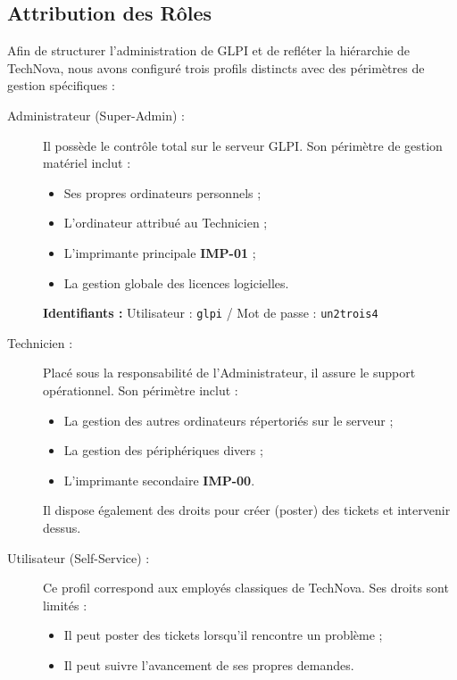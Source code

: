 \documentclass[a4paper,11pt]{article}
\begin{document}
\subsection{Attribution des Rôles}
Afin de structurer l'administration de GLPI et de refléter la hiérarchie de TechNova, nous avons configuré trois profils distincts avec des périmètres de gestion spécifiques :
\clearpage
\begin{description}
    \item[Administrateur (Super-Admin) :] 
    Il possède le contrôle total sur le serveur GLPI. Son périmètre de gestion matériel inclut :
    \begin{itemize}
        \item Ses propres ordinateurs personnels ;
        \item L'ordinateur attribué au Technicien ;
        \item L'imprimante principale \textbf{IMP-01} ;
        \item La gestion globale des licences logicielles.
    \end{itemize}
    \textbf{Identifiants :} Utilisateur : \texttt{glpi} / Mot de passe : \texttt{un2trois4}

    \item[Technicien :] 
    Placé sous la responsabilité de l'Administrateur, il assure le support opérationnel. Son périmètre inclut :
    \begin{itemize}
        \item La gestion des autres ordinateurs répertoriés sur le serveur ;
        \item La gestion des périphériques divers ;
        \item L'imprimante secondaire \textbf{IMP-00}.
    \end{itemize}
    Il dispose également des droits pour créer (poster) des tickets et intervenir dessus.

    \item[Utilisateur (Self-Service) :] 
    Ce profil correspond aux employés classiques de TechNova. Ses droits sont limités :
    \begin{itemize}
        \item Il peut poster des tickets lorsqu'il rencontre un problème ;
        \item Il peut suivre l'avancement de ses propres demandes.
    \end{itemize}
\end{description}
\end{document}
